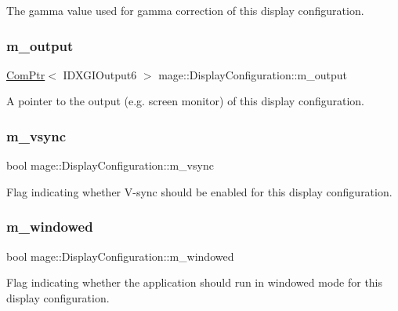 The gamma value used for gamma correction of this display configuration. \hypertarget{structmage_1_1_display_configuration_a57cc88b552858c6a9ac74577140beb14}{}\label{structmage_1_1_display_configuration_a57cc88b552858c6a9ac74577140beb14} 
\subsubsection{\texorpdfstring{m\+\_\+output}{m\_output}}
{\footnotesize\ttfamily \hyperlink{namespacemage_ae74f374780900893caa5555d1031fd79}{Com\+Ptr}$<$ I\+D\+X\+G\+I\+Output6 $>$ mage\+::\+Display\+Configuration\+::m\+\_\+output\hspace{0.3cm}{\ttfamily [private]}}

A pointer to the output (e.\+g. screen monitor) of this display configuration. \hypertarget{structmage_1_1_display_configuration_a22dd3b35e58260c9555a37aef0e85a4d}{}\label{structmage_1_1_display_configuration_a22dd3b35e58260c9555a37aef0e85a4d} 
\subsubsection{\texorpdfstring{m\+\_\+vsync}{m\_vsync}}
{\footnotesize\ttfamily bool mage\+::\+Display\+Configuration\+::m\+\_\+vsync\hspace{0.3cm}{\ttfamily [private]}}

Flag indicating whether V-\/sync should be enabled for this display configuration. \hypertarget{structmage_1_1_display_configuration_a0c447e4bd7ea72313315c657e9cd0d95}{}\label{structmage_1_1_display_configuration_a0c447e4bd7ea72313315c657e9cd0d95} 
\subsubsection{\texorpdfstring{m\+\_\+windowed}{m\_windowed}}
{\footnotesize\ttfamily bool mage\+::\+Display\+Configuration\+::m\+\_\+windowed\hspace{0.3cm}{\ttfamily [private]}}

Flag indicating whether the application should run in windowed mode for this display configuration. 